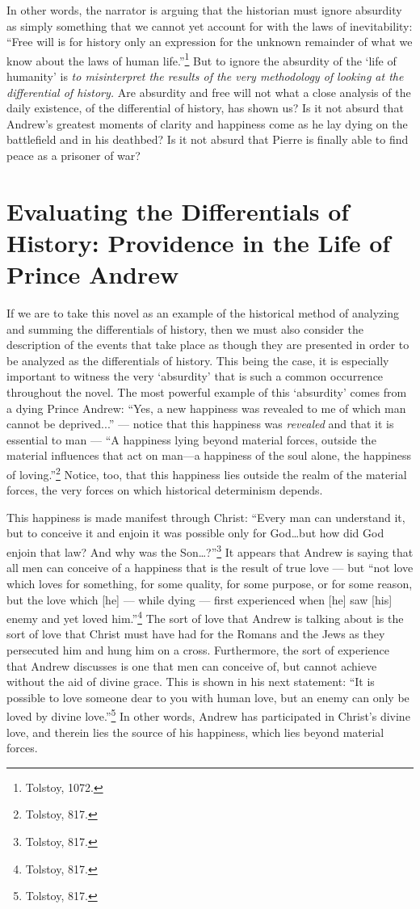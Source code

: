 \documentclass[12pt]{article}
\begin{document}
In other words, the narrator is arguing that the historian must ignore absurdity as simply something that we cannot yet account for with the laws of inevitability: ``Free will is for history only an expression for the unknown remainder of what we know about the laws of human life.''\footnote{Tolstoy, 1072.} But to ignore the absurdity of the `life of humanity’ is \emph{to misinterpret the results of the very methodology of looking at the differential of history.} Are absurdity and free will not what a close analysis of the daily existence, of the differential of history, has shown us? Is it not absurd that Andrew's greatest moments of clarity and happiness come as he lay dying on the battlefield and in his deathbed? Is it not absurd that Pierre is finally able to find peace as a prisoner of war?

\section{Evaluating the Differentials of History: Providence in the Life of Prince Andrew}

If we are to take this novel as an example of the historical method of analyzing and summing the differentials of history, then we must also consider the description of the events that take place as though they are presented in order to be analyzed as the differentials of history. This being the case, it is especially important to witness the very `absurdity' that is such a common occurrence throughout the novel. The most powerful example of this `absurdity' comes from a dying Prince Andrew: ``Yes, a new happiness was revealed to me of which man cannot be deprived...'' — notice that this happiness was \emph{revealed} and that it is essential to man — ``A happiness lying beyond material forces, outside the material influences that act on man—a happiness of the soul alone, the happiness of loving.''\footnote{Tolstoy, 817.} Notice, too, that this happiness lies outside the realm of the material forces, the very forces on which historical determinism depends.

This happiness is made manifest through Christ: ``Every man can understand it, but to conceive it and enjoin it was possible only for God…but how did God enjoin that law? And why was the Son…?''\footnote{Tolstoy, 817.} It appears that Andrew is saying that all men can conceive of a happiness that is the result of true love — but ``not love which loves for something, for some quality, for some purpose, or for some reason, but the love which [he] — while dying — first experienced when [he] saw [his] enemy and yet loved him.''\footnote{Tolstoy, 817.} The sort of love that Andrew is talking about is the sort of love that Christ must have had for the Romans and the Jews as they persecuted him and hung him on a cross. Furthermore, the sort of experience that Andrew discusses is one that men can conceive of, but cannot achieve without the aid of divine grace. This is shown in his next statement: ``It is possible to love someone dear to you with human love, but an enemy can only be loved by divine love.''\footnote{Tolstoy, 817.} In other words, Andrew has participated in Christ’s divine love, and therein lies the source of his happiness, which lies beyond material forces.
\end{document}
